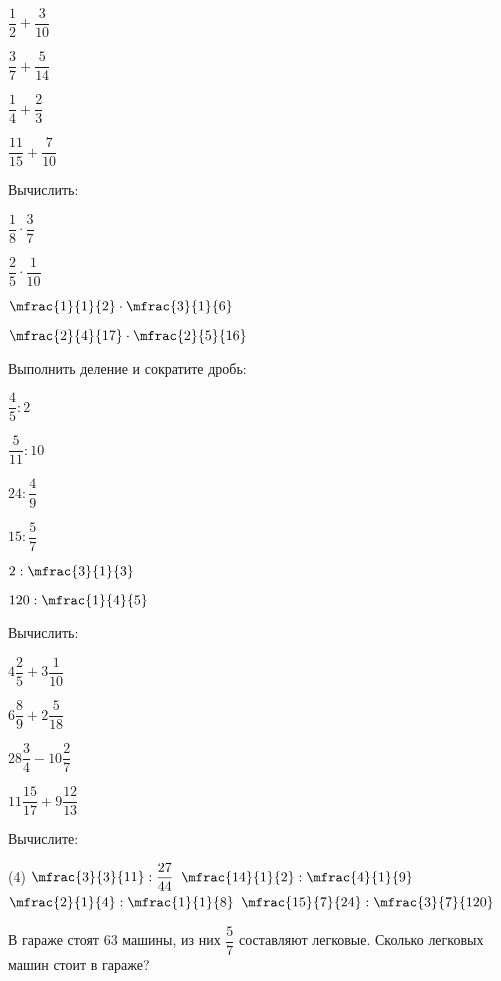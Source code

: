 \begin{class}[number=1]
\begin{listofex}
\begin{enumcols}[itemcolumns=4]
			\item \( \dfrac{1}{2}+\dfrac{3}{10} \)
			\item \( \dfrac{3}{7}+\dfrac{5}{14} \)
			\item \( \dfrac{1}{4}+\dfrac{2}{3} \)
			\item \( \dfrac{11}{15}+\dfrac{7}{10} \)
		\end{enumcols}
		\item Вычислить:
		\begin{enumcols}[itemcolumns=4]
			\item \( \dfrac{1}{8}\cdot\dfrac{3}{7} \)
			\item \( \dfrac{2}{5}\cdot\dfrac{1}{10} \)
			\item \( \mfrac{1}{1}{2}\cdot\mfrac{3}{1}{6} \)
			\item \( \mfrac{2}{4}{17}\cdot\mfrac{2}{5}{16} \)
		\end{enumcols}
		\item Выполнить деление и сократите дробь:
		\begin{enumcols}[itemcolumns=3]
			\item \( \dfrac{4}{5}:2 \)
			\item \( \dfrac{5}{11}:10 \)
			\item \( 24:\dfrac{4}{9} \)
			\item \( 15:\dfrac{5}{7} \)
			\item \( 2:\mfrac{3}{1}{3} \)
			\item \( 120:\mfrac{1}{4}{5} \)
		\end{enumcols} 
		\item Вычислить:
		\begin{enumcols}[itemcolumns=4]
			\item \( 4\dfrac{2}{5}+3\dfrac{1}{10} \)
			\item \( 6\dfrac{8}{9}+2\dfrac{5}{18} \)
			\item \( 28\dfrac{3}{4}-10\dfrac{2}{7} \)
			\item \( 11\dfrac{15}{17}+9\dfrac{12}{13} \)
		\end{enumcols}
			\item Вычислите:
		\begin{tasks}(4)
			\task \( \mfrac{3}{3}{11}:\dfrac{27}{44} \)
			\task \( \mfrac{14}{1}{2}:\mfrac{4}{1}{9} \)
			\task \( \mfrac{2}{1}{4}:\mfrac{1}{1}{8} \)
			\task \( \mfrac{15}{7}{24}:\mfrac{3}{7}{120} \)
		\end{tasks}
		\item  В гараже стоят \( 63 \) машины, из них \( \dfrac{5}{7} \) составляют легковые. Сколько легковых машин стоит в гараже?

\end{listofex}
\end{class}
